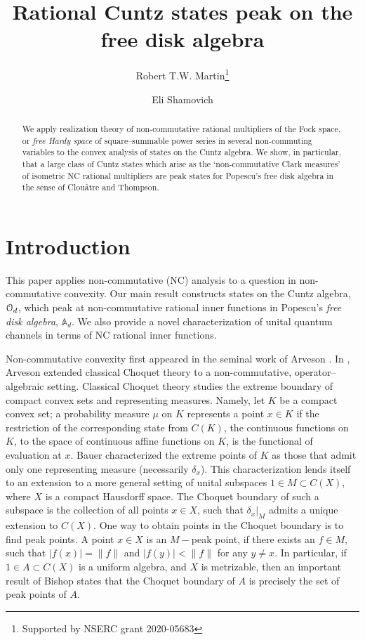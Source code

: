 \documentclass{article}
\title{Rational Cuntz states peak on the free disk algebra}
\author[1]{Robert T.W. Martin\thanks{Supported by NSERC grant 2020-05683}}
\affil[1]{\footnotesize University of Manitoba}
\author[2]{Eli Shamovich}
\affil[2]{ \footnotesize Ben-Gurion University of the Negev}
\date{}
\theoremstyle{definition}
\theoremstyle{remark}
\numberwithin{equation}{section}
\newcommand{\cuntz}{\ensuremath{\cO_d}}
\def\A{\mathbb{A} _d}
\begin{document}
\maketitle

\begin{abstract}
We apply realization theory of non-commutative rational multipliers of the Fock space, or \emph{free Hardy space} of square--summable power series in several non-commuting variables to the convex analysis of states on the Cuntz algebra. We show, in particular, that a large class of Cuntz states which arise as the `non-commutative Clark measures' of isometric NC rational multipliers are peak states for Popescu's free disk algebra in the sense of Clou\^atre and Thompson.
\end{abstract}

\section{Introduction}

This paper applies non-commutative (NC) analysis to a question in non-commutative convexity. Our main result constructs states on the Cuntz algebra, $\cuntz$, which peak at non-commutative rational inner functions in Popescu's \emph{free disk algebra}, $\A$.  We also provide a novel characterization of unital quantum channels in terms of NC rational inner functions.

Non-commutative convexity first appeared in the seminal work of Arveson \cite{Arv-subalg}. In \cite{Arv-subalg}, Arveson extended classical Choquet theory to a non-commutative, operator--algebraic setting. Classical Choquet theory studies the extreme boundary of compact convex sets and representing measures. Namely, let $K$ be a compact convex set; a probability measure $\mu$ on $K$ represents a point $x \in K$ if the restriction of the corresponding state from $C(K)$, the continuous functions on $K$, to the space of continuous affine functions on $K$, is the functional of evaluation at $x$. Bauer characterized the extreme points of $K$ as those that admit only one representing measure (necessarily $\delta_x$). This characterization lends itself to an extension to a more general setting of unital subspaces $1 \in M \subset C(X)$, where $X$ is a compact Hausdorff space. The Choquet boundary of such a subspace is the collection of all points $x \in X$, such that $\delta_x|_M$ admits a unique extension to $C(X)$. One way to obtain points in the Choquet boundary is to find peak points. A point $x \in X$ is an $M-$peak point, if there exists an $f \in M$, such that $|f(x)| = \|f\|$ and $|f(y)| < \| f \|$ for any $y \neq x$. In particular, if $1 \in A \subset C(X)$ is a uniform algebra, and $X$ is metrizable, then an important result of Bishop states that the Choquet boundary of $A$ is precisely the set of peak points of $A$.
\end{document}
